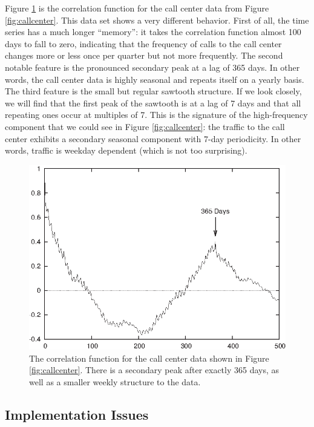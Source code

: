 Figure \ref{fig:callcentercorr} is the correlation function for the
call center data from Figure \ref{fig:callcenter}. This data set shows
a very different behavior. First of all, the time series has a much
longer ``memory'': it takes the correlation function almost 100 days
to fall to zero, indicating that the frequency of calls to the call
center changes more or less once per quarter but not more frequently.
The second notable feature is the pronounced secondary peak at a lag
of 365 days. In other words, the call center data is highly seasonal
and repeats itself on a yearly basis.  The third feature is the small
but regular sawtooth structure. If we look closely, we will find that
the first peak of the sawtooth is at a lag of 7 days and that all
repeating ones occur at multiples of 7. This is the signature of the
high-frequency component that we could see in Figure
\ref{fig:callcenter}: the traffic to the call center exhibits a
secondary seasonal component with 7-day periodicity. In other words,
traffic is weekday dependent (which is not too surprising).

\begin{figure}
  \centerline{ \includegraphics{img/callcentercorr}}
  \caption{The correlation function for the call center data shown in
    Figure \ref{fig:callcenter}. There is a secondary peak after
    exactly 365 days, as well as a smaller weekly structure to the
    data.}
  \label{fig:callcentercorr}
\end{figure}


\subsection{Implementation Issues}

